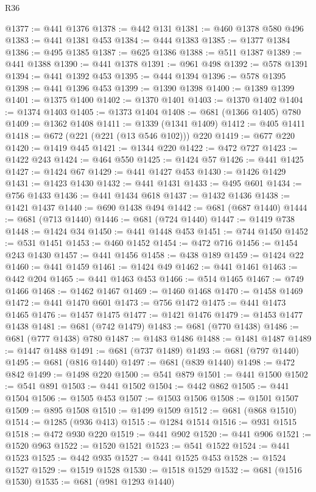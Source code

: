 \begin{lexlean}{R36}
\begin{coremodule}
@1377 := @441 @1376
@1378 := @442 @131
@1381 := @460 @1378 @580 @496
@1383 := @441 @1381 @453
@1384 := @444 @1383
@1385 := @1377 @1384
@1386 := @495 @1385
@1387 := @625 @1386
@1388 := @511 @1387
@1389 := @441 @1388
@1390 := @441 @1378
@1391 := @961 @498
@1392 := @578 @1391
@1394 := @441 @1392 @453
@1395 := @444 @1394
@1396 := @578 @1395
@1398 := @441 @1396 @453
@1399 := @1390 @1398
@1400 := @1389 @1399
@1401 := @1375 @1400
@1402 := @1370 @1401
@1403 := @1370 @1402
@1404 := @1374 @1403
@1405 := @1373 @1404
@1408 := @681 (@1366 @1405) @780
@1409 := @1362 @1408
@1411 := @1339 (@1341 @1409)
@1412 := @405 @1411
@1418 := @672 (@221 (@221 (@13 @546 @102))) @220
@1419 := @677 @220
@1420 := @1419 @445
@1421 := @1344 @220
@1422 := @472 @727
@1423 := @1422 @243
@1424 := @464 @550
@1425 := @1424 @57
@1426 := @441 @1425
@1427 := @1424 @67
@1429 := @441 @1427 @453
@1430 := @1426 @1429
@1431 := @1423 @1430
@1432 := @441 @1431
@1433 := @495 @601
@1434 := @756 @1433
@1436 := @441 @1434 @618
@1437 := @1432 @1436
@1438 := @1421 @1437
@1440 := @690 @1438 @494
@1442 := @681 (@687 @1440)
@1444 := @681 (@713 @1440)
@1446 := @681 (@724 @1440)
@1447 := @1419 @738
@1448 := @1424 @34
@1450 := @441 @1448 @453
@1451 := @744 @1450
@1452 := @531 @1451
@1453 := @460 @1452
@1454 := @472 @716
@1456 := @1454 @243 @1430
@1457 := @441 @1456
@1458 := @438 @189
@1459 := @1424 @22
@1460 := @441 @1459
@1461 := @1424 @49
@1462 := @441 @1461
@1463 := @442 @204
@1465 := @441 @1463 @453
@1466 := @514 @1465
@1467 := @749 @1466
@1468 := @1462 @1467
@1469 := @1460 @1468
@1470 := @1458 @1469
@1472 := @441 @1470 @601
@1473 := @756 @1472
@1475 := @441 @1473 @1465
@1476 := @1457 @1475
@1477 := @1421 @1476
@1479 := @1453 @1477 @1438
@1481 := @681 (@742 @1479)
@1483 := @681 (@770 @1438)
@1486 := @681 (@777 @1438) @780
@1487 := @1483 @1486
@1488 := @1481 @1487
@1489 := @1447 @1488
@1491 := @681 (@737 @1489)
@1493 := @681 (@797 @1440)
@1495 := @681 (@816 @1440)
@1497 := @681 (@839 @1440)
@1498 := @472 @842
@1499 := @1498 @220
@1500 := @541 @879
@1501 := @441 @1500
@1502 := @541 @891
@1503 := @441 @1502
@1504 := @442 @862
@1505 := @441 @1504
@1506 := @1505 @453
@1507 := @1503 @1506
@1508 := @1501 @1507
@1509 := @895 @1508
@1510 := @1499 @1509
@1512 := @681 (@868 @1510)
@1514 := @1285 (@936 @413)
@1515 := @1284 @1514
@1516 := @931 @1515
@1518 := @472 @930 @220
@1519 := @441 @902
@1520 := @441 @906
@1521 := @1520 @963
@1522 := @1520 @1521
@1523 := @541 @1522
@1524 := @441 @1523
@1525 := @442 @935
@1527 := @441 @1525 @453
@1528 := @1524 @1527
@1529 := @1519 @1528
@1530 := @1518 @1529
@1532 := @681 (@1516 @1530)
@1535 := @681 (@981 @1293 @1440)

\end{coremodule}
\end{lexlean}
